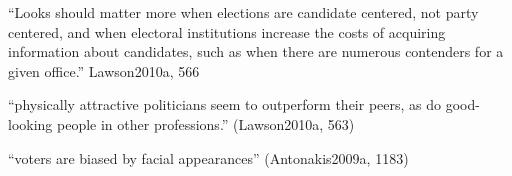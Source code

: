 




		``Looks should matter more when elections are candidate centered, not party centered, and when electoral institutions increase the costs of acquiring information about candidates, such as when there are numerous contenders for a given office.'' Lawson2010a, 566

		``physically attractive politicians seem to outperform their peers, as do good-looking people in other professions.'' (Lawson2010a, 563)

		``voters are biased by facial appearances'' (Antonakis2009a, 1183)



	






